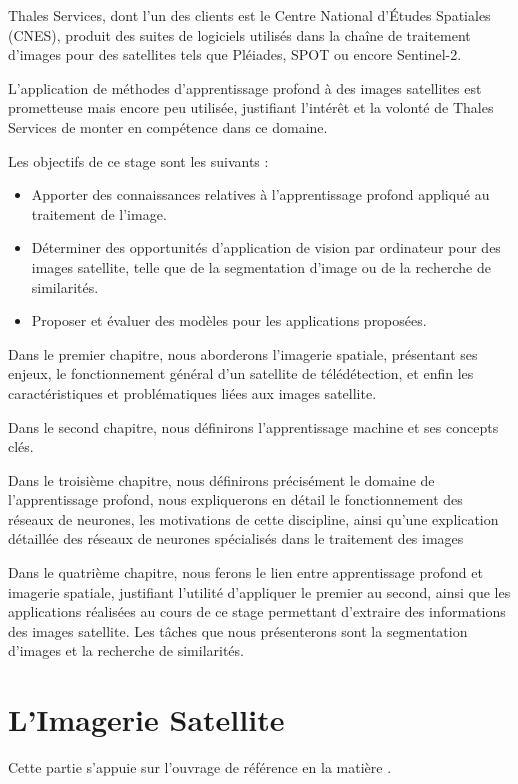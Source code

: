 \documentclass[a4paper, 11pt]{report}
\begin{document}
Thales Services, dont l'un des clients est le Centre National d'Études Spatiales (CNES), produit des suites de logiciels utilisés dans la chaîne de traitement d'images pour des satellites tels que Pléiades, SPOT ou encore Sentinel-2.

L'application de méthodes d'apprentissage profond à des images satellites est prometteuse mais encore peu utilisée, justifiant l'intérêt et la volonté de Thales Services de monter en compétence dans ce domaine.

Les objectifs de ce stage sont les suivants :
\begin{itemize}
	\item Apporter des connaissances relatives à l'apprentissage profond appliqué au traitement de l'image.
	\item Déterminer des opportunités d'application de vision par ordinateur pour des images satellite, telle que de la segmentation d'image ou de la recherche de similarités.
	\item Proposer et évaluer des modèles pour les applications proposées.
\end{itemize}

Dans le premier chapitre, nous aborderons l'imagerie spatiale, présentant ses enjeux, le fonctionnement général d'un satellite de télédétection, et enfin les caractéristiques et problématiques liées aux images satellite.

Dans le second chapitre, nous définirons l'apprentissage machine et ses concepts clés.

Dans le troisième chapitre, nous définirons précisément le domaine de l'apprentissage profond, nous expliquerons en détail le fonctionnement des réseaux de neurones, les motivations de cette discipline, ainsi qu'une explication détaillée des réseaux de neurones spécialisés dans le traitement des images

Dans le quatrième chapitre, nous ferons le lien entre apprentissage profond et imagerie spatiale, justifiant l'utilité d'appliquer le premier au second, ainsi que les applications réalisées au cours de ce stage permettant d'extraire des informations des images satellite. Les tâches que nous présenterons sont la segmentation d'images et la recherche de similarités.

\chapter{L'Imagerie Satellite}
Cette partie s'appuie sur l'ouvrage de référence en la matière \citep{CNES/ONERA/IGN2008}.
\end{document}
